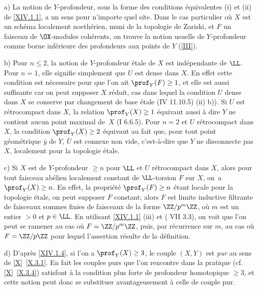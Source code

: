\skpt
\begin{remarques} \label{XIV.1.6}
a) La notion de $Y$-profondeur, sous la forme des conditions \'equivalentes \textup{(i)} et \textup{(ii)} de \ref{XIV.1.1}, a un sens pour n'importe quel site. Dans le cas particulier o\`u $X$ est un sch\'ema localement noeth\'erien, muni de la topologie de Zariski, et $F$ un faisceau de $\OX$-modules coh\'erents, on trouve la notion usuelle de $Y$-profondeur comme borne inf\'erieure des profondeurs aux points de $Y$ (\ref{III}).

b) Pour $n\leq 2$, la notion de $Y$-profondeur \'etale de $X$ est ind\'ependante de $\LL$. Pour $n=1$, elle signifie simplement que $U$ est dense dans $X$. En effet cette condition est n\'ecessaire pour que l'on ait $\prof_Y(F)\geq 1$, et elle est aussi suffisante car on peut supposer $X$ r\'eduit, cas dans lequel la condition $U$ dense dans $X$ se conserve par changement de base \'etale \textup{(\EGA IV 11.10.5) \textup{(ii)} b))}. Si $U$ est r\'etrocompact dans $X$, la relation $\prof_Y(X)\geq 1$ \'equivaut aussi \`a dire $Y$ ne contient aucun point maximal de~$X$ (\EGA I 6.6.5). Pour $n=2$ et $U$ r\'etrocompact dans $X$, la condition $\prof_Y(X)\geq 2$ \'equivaut au fait que, pour tout point g\'eom\'etrique $\bar y$ de $Y$, $\bar U$ est connexe non vide, c'est-\`a-dire que \og $Y$ ne disconnecte pas $X$, localement pour la topologie \'etale\fg.

c) Si $X$ est de $Y$-profondeur $\geq n$ pour $\LL$ et $U$ r\'etrocompact dans $X$, alors pour tout faisceau ab\'elien localement constant de $\LL$-torsion $F$ sur $X$, on~a $\prof_Y(X)\geq n$. En effet, la propri\'et\'e $\prof_Y(F)\geq n$ \'etant locale pour la topologie \'etale, on peut supposer $F$ constant; alors $F$ est limite inductive filtrante de faisceaux sommes finies de faisceaux de la forme $\ZZ/p^m\ZZ$, o\`u $m$ est un entier $>0$ et $p\in \LL$. En utilisant \ref{XIV.1.1} \textup{(iii)} et \textup{( VII 3.3)}, on voit que l'on peut se ramener au cas o\`u $F=\ZZ/p^m\ZZ$, puis, par r\'ecurrence sur $m$, au cas o\`u $F=\ZZ/p\ZZ$ pour lequel l'assertion r\'esulte de la d\'efinition.

d) D'apr\`es \ref{XIV.1.4}, si l'on a $\prof_Y(X)\geq 3$, le couple $(X, Y)$ est \textit{pur} au sens de \ref{X}~\ref{X.3.1}. En fait les couples purs que l'on rencontre dans la pratique (cf. \ref{X}~\ref{X.3.4}) satisfont \`a la condition plus forte de profondeur homotopique $\geq 3$, et cette notion peut donc se substituer avantageusement \`a celle de couple pur.


\end{remarques}

